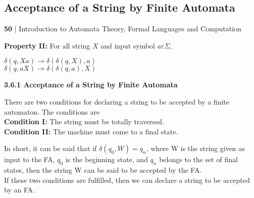 \documentclass[8pt]{beamer}
\begin{document}
\begin{frame}
\section*{Acceptance of a String by Finite Automata}
 \begin{flushleft}
    \textbf{50}\hspace*{0.1cm} \textbf{$|$} \hspace*{0.1cm} Introduction to Automata Theory, Formal Languages and Computation
  \end{flushleft}
\vspace*{0.3cm}

 \textbf{Property II:} For all string $X$ and input symbol $a \varepsilon \Sigma$,\\
\begin{center}
  $\delta(q, Xa) \rightarrow \delta(\delta(q, X), a)$ \\
  $\delta(q, aX) \rightarrow \delta(\delta(q, a), X)$ \\
\end{center}
\vspace*{0.1cm}

\large{
\textbf{3.6.1 Acceptance of a String by Finite Automata}\\
}
\vspace*{0.2cm}

\small{
There are two conditions for declaring a string to be accepted by a finite automaton. The conditions are}\\

\vspace*{0.2cm}
\hspace*{0.5cm} \textbf{Condition I:} The string must be totally traversed.\\

\hspace*{0.5cm} \textbf{Condition II:} The machine must come to a final state.\\

\vspace*{0.2cm}

In short, it can be said that if $\delta(q_{0}, W) = q_{n}$, where W is the string given as input to the FA, $q_{0}$ is the beginning
state, and $q_{n}$ belongs to the set of final states, then the string W can be said to be accepted by the FA.\\
\hspace*{0.5cm} If these two conditions are fulfilled, then we can declare a string to be accepted by an FA.\\
\end{frame}
\end{document}
